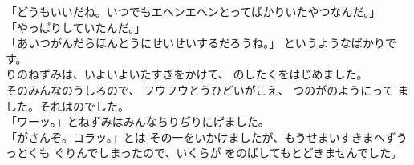 \documentclass[
    a4paper,
    10pt,
    book]
    {tarticle}
\begin{document}
\newpage
\thispagestyle{fancy}
「どうもいいだね。いつでもエヘンエヘンとってばかりいたやつなんだ。」\\
「やっぱりしていたんだ。」\\
「あいつがんだらほんとうにせいせいするだろうね。」
というようなばかりです。\\
\indent {}りのねずみは、いよいよいたすきをかけて、
のしたくをはじめました。\\
\indent そのみんなのうしろので、
フウフウとうひどいがこえ、
つのがのようにって
ました。それはのでした。\\
「ワーッ。」とねずみはみんなちりぢりにげました。\\
「がさんぞ。コラッ。」とは
その一をいかけましたが、もうせまいすきまへずうっとくも
ぐりんでしまったので、いくらが
をのばしてもとどきませんでした。

\newpage
\thispagestyle{fancy}
\end{document}
